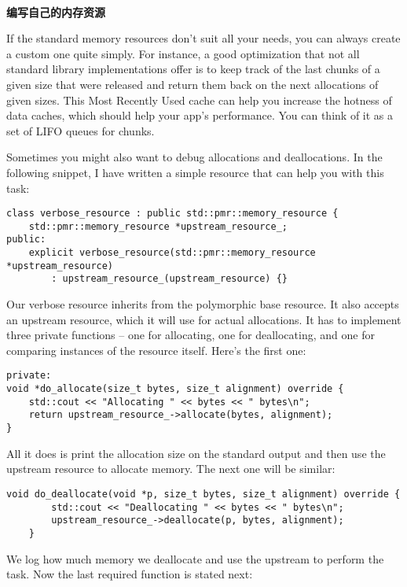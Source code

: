 \hspace*{\fill} \\ %
\noindent
\textbf{编写自己的内存资源}

If the standard memory resources don't suit all your needs, you can always create a custom one quite simply. For instance, a good optimization that not all standard library implementations offer is to keep track of the last chunks of a given size that were released and return them back on the next allocations of given sizes. This Most Recently Used cache can help you increase the hotness of data caches, which should help your app's performance. You can think of it as a set of LIFO queues for chunks.

Sometimes you might also want to debug allocations and deallocations. In the following snippet, I have written a simple resource that can help you with this task:

\begin{lstlisting}[style=styleCXX]
class verbose_resource : public std::pmr::memory_resource {
	std::pmr::memory_resource *upstream_resource_;
public:
	explicit verbose_resource(std::pmr::memory_resource *upstream_resource)
		: upstream_resource_(upstream_resource) {}
\end{lstlisting}

Our verbose resource inherits from the polymorphic base resource. It also accepts an upstream resource, which it will use for actual allocations. It has to implement three private functions – one for allocating, one for deallocating, and one for comparing instances of the resource itself. Here's the first one:

\begin{lstlisting}[style=styleCXX]
private:
void *do_allocate(size_t bytes, size_t alignment) override {
	std::cout << "Allocating " << bytes << " bytes\n";
	return upstream_resource_->allocate(bytes, alignment);
}
\end{lstlisting}

All it does is print the allocation size on the standard output and then use the upstream resource to allocate memory. The next one will be similar:

\begin{lstlisting}[style=styleCXX]
	void do_deallocate(void *p, size_t bytes, size_t alignment) override {
		std::cout << "Deallocating " << bytes << " bytes\n";
		upstream_resource_->deallocate(p, bytes, alignment);
	}
\end{lstlisting}

We log how much memory we deallocate and use the upstream to perform the task. Now the last required function is stated next:


